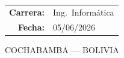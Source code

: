 \begin{titlepage}
  \vspace{1cm}

  \begin{tabular}{rl}
    \textbf{Carrera:} & Ing.\ Informática \\[4pt]
    \textbf{Fecha:}    & 05/06/2026 \\
  \end{tabular}

  \vfill

  {\large COCHABAMBA — BOLIVIA}
\end{titlepage}
\newpage